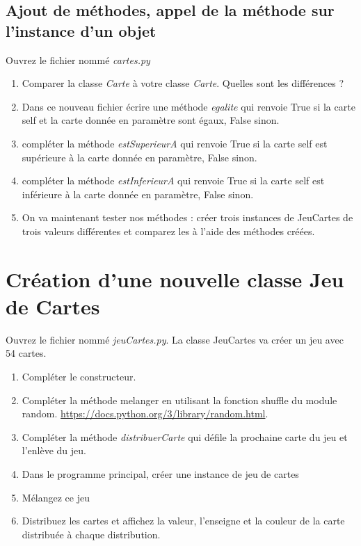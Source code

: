 \subsection*{Ajout de méthodes, appel de la méthode sur l'instance d'un objet}

Ouvrez le fichier nommé \textit{cartes.py}\\
\begin{enumerate}
    \item Comparer la classe \textit{Carte} à votre classe \textit{Carte}. Quelles sont les différences ?
    \item Dans ce nouveau fichier écrire une méthode \textit{egalite} qui renvoie True si la carte self et la carte donnée en paramètre sont égaux, False sinon.
    \item compléter la méthode \textit{estSuperieurA} qui renvoie True si la carte self est supérieure à la carte donnée en paramètre, False sinon.
    \item compléter la méthode \textit{estInferieurA} qui renvoie True si la carte self est inférieure à la carte donnée en paramètre, False sinon.
    \item On va maintenant tester nos méthodes : créer trois instances de JeuCartes de trois valeurs différentes et comparez les à l'aide des méthodes créées.
\end{enumerate}

\section*{Création d'une nouvelle classe Jeu de Cartes}

Ouvrez le fichier nommé \textit{jeuCartes.py}. La classe JeuCartes va créer un jeu avec 54 cartes. 

\begin{enumerate}
    \item Compléter le constructeur.
    \item Compléter la méthode melanger en utilisant la fonction shuffle du module random. \url{https://docs.python.org/3/library/random.html}.
    \item Compléter la méthode \textit{distribuerCarte} qui défile la prochaine carte du jeu et l'enlève du jeu.
    \item Dans le programme principal, créer une instance de jeu de cartes
    \item Mélangez ce jeu
    \item Distribuez les cartes et affichez la valeur, l'enseigne et la couleur de la carte distribuée à chaque distribution.
\end{enumerate}